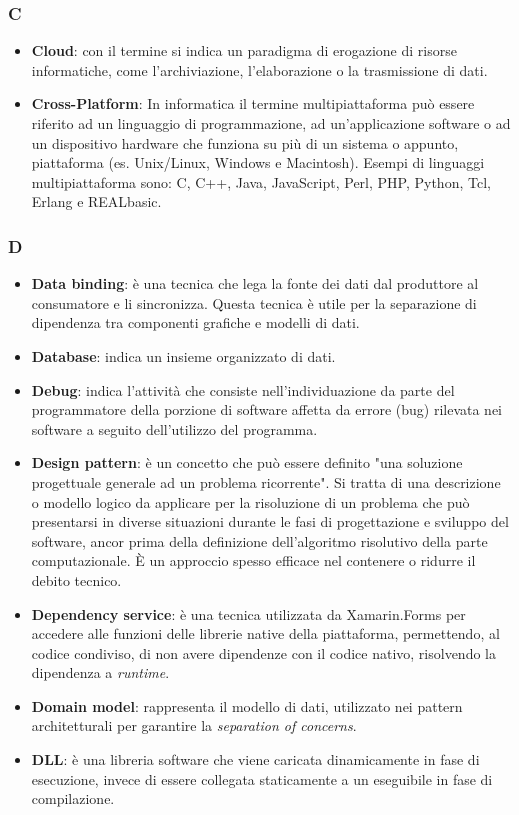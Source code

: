 \subsubsection{C}
\begin{itemize}
	\item \textbf{Cloud}: con il termine si indica un paradigma di erogazione di risorse informatiche, come l'archiviazione, l'elaborazione o la trasmissione di dati.
	\item \textbf{Cross-Platform}: In informatica il termine multipiattaforma può essere riferito ad un linguaggio di programmazione, ad un'applicazione software o ad un dispositivo hardware che funziona su più di un sistema o appunto, piattaforma (es. Unix/Linux, Windows e Macintosh). Esempi di linguaggi multipiattaforma sono: C, C++, Java, JavaScript, Perl, PHP, Python, Tcl, Erlang e REALbasic.
\end{itemize}

\subsubsection{D}
\begin{itemize}
	\item \textbf{Data binding}: è una tecnica che lega la fonte dei dati dal produttore al consumatore e li sincronizza. Questa tecnica è utile per la separazione di dipendenza tra componenti grafiche e modelli di dati.
	\item \textbf{Database}: indica un insieme organizzato di dati.
	\item \textbf{Debug}:  indica l'attività che consiste nell'individuazione da parte del programmatore della porzione di software affetta da errore (bug) rilevata nei software a seguito dell'utilizzo del programma.
	\item \textbf{Design pattern}: è un concetto che può essere definito "una soluzione progettuale generale ad un problema ricorrente". Si tratta di una descrizione o modello logico da applicare per la risoluzione di un problema che può presentarsi in diverse situazioni durante le fasi di progettazione e sviluppo del software, ancor prima della definizione dell'algoritmo risolutivo della parte computazionale. È un approccio spesso efficace nel contenere o ridurre il debito tecnico.
	\item \textbf{Dependency service}: è una tecnica utilizzata da Xamarin.Forms per accedere alle funzioni delle librerie native della piattaforma, permettendo, al codice condiviso, di non avere dipendenze con il codice nativo, risolvendo la dipendenza a \textit{runtime}.
	\item \textbf{Domain model}: rappresenta il modello di dati, utilizzato nei pattern architetturali per garantire la \textit{separation of concerns}.
	\item \textbf{DLL}: è una libreria software che viene caricata dinamicamente in fase di esecuzione, invece di essere collegata staticamente a un eseguibile in fase di compilazione.
\end{itemize}

